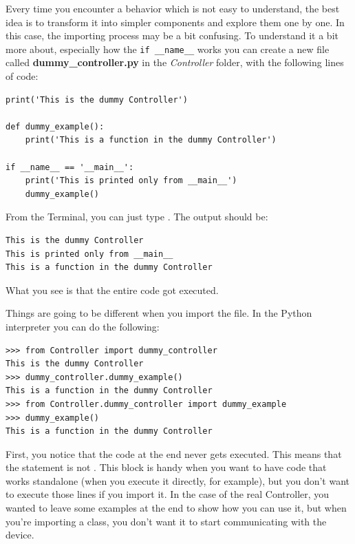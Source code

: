 Every time you encounter a behavior which is not easy to understand, the best idea is to transform it into simpler components and explore them one by one. In this case, the importing process may be a bit confusing. To understand it a bit more about, especially how the \texttt{if __name__} works you can create a new file called \textbf{dummy\_controller.py} in the \emph{Controller} folder, with the following lines of code:

\begin{verbatim}
print('This is the dummy Controller')

def dummy_example():
    print('This is a function in the dummy Controller')

if __name__ == '__main__':
    print('This is printed only from __main__')
    dummy_example()

\end{verbatim}

\sloppy From the Terminal, you can just type . The output should be:

\begin{verbatim}
This is the dummy Controller
This is printed only from __main__
This is a function in the dummy Controller
\end{verbatim}

What you see is that the entire code got executed.


Things are going to be different when you import the file. In the Python interpreter you can do the following:

\begin{verbatim}
>>> from Controller import dummy_controller
This is the dummy Controller
>>> dummy_controller.dummy_example()
This is a function in the dummy Controller
>>> from Controller.dummy_controller import dummy_example
>>> dummy_example()
This is a function in the dummy Controller
\end{verbatim}

First, you notice that the code at the end never gets executed. This means that the  statement is not . This block is handy when you want to have code that works standalone (when you execute it directly, for example), but you don't want to execute those lines if you import it. In the case of the real Controller, you wanted to leave some examples at the end to show how you can use it, but when you're importing a class, you don't want it to start communicating with the device.

